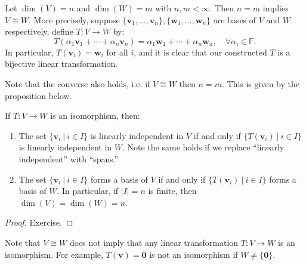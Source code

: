 \begin{example} \label{eg:isodim}
Let \(\dim(V) = n\) and  \(\dim(W) =m \) with \( n,m < \infty\). Then $n = m$ implies \(V \cong W\). More precisely, suppose \(\{ \mathbf{v}_1, \ldots, \mathbf{v}_n \}, \{ \mathbf{w}_1, \ldots, \mathbf{w}_n \}\) are bases of \(V\) and \(W\) respectively, define \(T : V \rightarrow W\) by:
\[
T(\alpha_1 \mathbf{v}_1 + \cdots + \alpha_n \mathbf{v}_n) = \alpha_1 \mathbf{w}_1 + \cdots + \alpha_n \mathbf{w}_n, \quad \forall \alpha_i \in \mathbb{F}.
\]
In particular, \(T(\mathbf{v}_i) = \mathbf{w}_i\) for all \(i\), and it is clear that our constructed \(T\) is a bijective linear transformation.

Note that the converse also holds, i.e. if $V \cong W$ then $n = m$. This is given by the proposition below.
\end{example}


\begin{proposition}\label{prop: isomorphism-properties}
If \(T : V \rightarrow W\) is an isomorphism, then:
\begin{enumerate}
  \item The set \(\{ \mathbf{v}_i \ |\ i \in I \}\) is linearly independent in \(V\) if and only if \(\{ T(\mathbf{v}_i)\  |\  i \in I \}\) is linearly independent in \(W\).
  Note the same holds if we replace ``linearly independent'' with ``spans.''
  \item The set \(\{ \mathbf{v}_i \ |\ i \in I \}\) forms a basis of \(V\) if and only if \(\{ T(\mathbf{v}_i)\  |\  i \in I \}\) forms a basis of \(W\). In particular, if $|I| = n$ is finite, then \(\dim(V) = \dim(W) = n\).
\end{enumerate}
\end{proposition}

\begin{proof}
Exercise. %
\end{proof}


 

\begin{remark}
Note that \(V \cong W\) does not imply that any linear transformation \(T : V \rightarrow W\) is an isomorphism. For example, \(T(\mathbf{v}) = \mathbf{0}\) is not an isomorphism if \(W \neq \{ \mathbf{0} \}\).
\end{remark}


